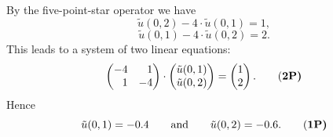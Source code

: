 \begin{loesung}
\begin{teilaufgaben}
\item
By the five-point-star operator we have
\[
\tilde u(0,2) - 4 \cdot \tilde u(0,1) = 1,
\]
\[
\tilde u(0,1) - 4 \cdot \tilde u(0,2) = 2.
\]
This leads to a system of two linear equations:
\begin{equation}
\begin{pmatrix*}[r] -4 & 1 \\  1 & -4 \end{pmatrix*}
\cdot
\begin{pmatrix} \tilde u(0,1)  \\   \tilde u(0,2)  \end{pmatrix}
=
\begin{pmatrix*}[r] 1  \\  2 \end{pmatrix*}.
\tag{\bf{2P}}
\end{equation}
Hence
\begin{equation}
\tilde u(0,1) = -0.4 \qquad\text{and}\qquad \tilde u(0,2) = -0.6.
\tag{\bf{1P}}
\end{equation}
\end{teilaufgaben}
\end{loesung}
